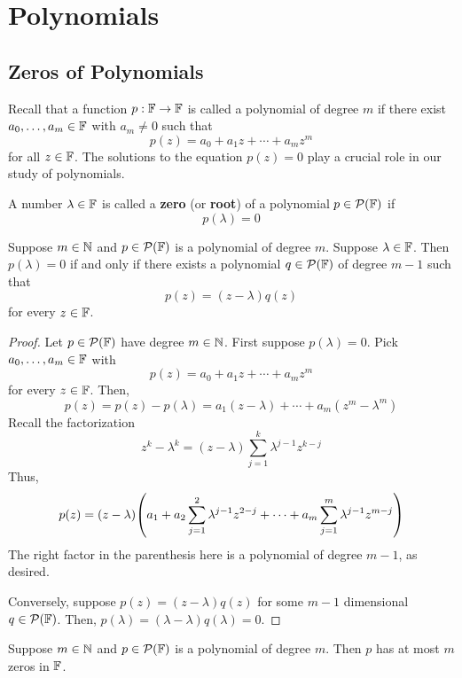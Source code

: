 \chapter{Polynomials}
\section{Zeros of Polynomials}
Recall that a function $p: \mathbb F \to \mathbb F$ is called a polynomial of degree $m$ if there exist $a_0, \dots, a_m \in \mathbb F$ with $a_m \ne 0$ such that
\[ p(z) = a_0 + a_1z + \cdots + a_mz^m \]
for all $z\in \mathbb F$. The solutions to the equation $p(z) = 0$ play a crucial role in our study of polynomials.
\begin{definition}
    A number $\lambda \in \mathbb F$ is called a \textbf{zero} (or \textbf{root}) of a polynomial $p\in \mathcal{P}(\mathbb F)$ if
    \[ p(\lambda) = 0\]
\end{definition}
\begin{theorem} \label{zerofactor1}
    Suppose $m\in\mathbb{N}$ and $p\in \mathcal{P}(\mathbb F)$ is a polynomial of degree $m$. Suppose $\lambda\in\mathbb F$. Then $p(\lambda) = 0$ if and only if there exists a polynomial $q\in\mathcal{P}(\mathbb F)$ of degree $m-1$ such that
    \[ p(z) = (z - \lambda)q(z)\]
    for every $z\in \mathbb F$.
\end{theorem}
\begin{proof}
    Let $p\in\mathcal{P}(\mathbb F)$ have degree $m\in\mathbb{N}$. First suppose $p(\lambda) = 0$. Pick $a_0, \dots, a_m\in\mathbb F$ with
    \[ p(z) = a_0 + a_1z + \cdots + a_mz^m \]
    for every $z\in\mathbb F$. Then, 
    \[ p(z) = p(z) - p(\lambda) = a_1(z-\lambda) + \cdots + a_m(z^m-\lambda^m) \]
    Recall the factorization
    \[ z^k - \lambda^k = (z-\lambda) \sum_{j=1}^k \lambda^{j-1}z^{k-j} \]
    Thus, 
    \begin{align*}
        p(z) = (z-\lambda) \pqty{a_1 + a_2\sum_{j=1}^2 \lambda^{j-1}z^{2-j} + \cdots + a_m\sum_{j=1}^m \lambda^{j-1}z^{m-j}}
    \end{align*}
    The right factor in the parenthesis here is a polynomial of degree $m-1$, as desired.

    Conversely, suppose $p(z) = (z-\lambda)q(z)$ for some $m-1$ dimensional $q\in\mathcal{P}(\mathbb F)$. Then, $p(\lambda) = (\lambda - \lambda)q(\lambda) = 0$.
\end{proof}
\begin{theorem}
    Suppose $m\in\mathbb{N}$ and $p\in\mathcal{P}(\mathbb F)$ is a polynomial of degree $m$. Then $p$ has at most $m$ zeros in $\mathbb F$.
\end{theorem}
